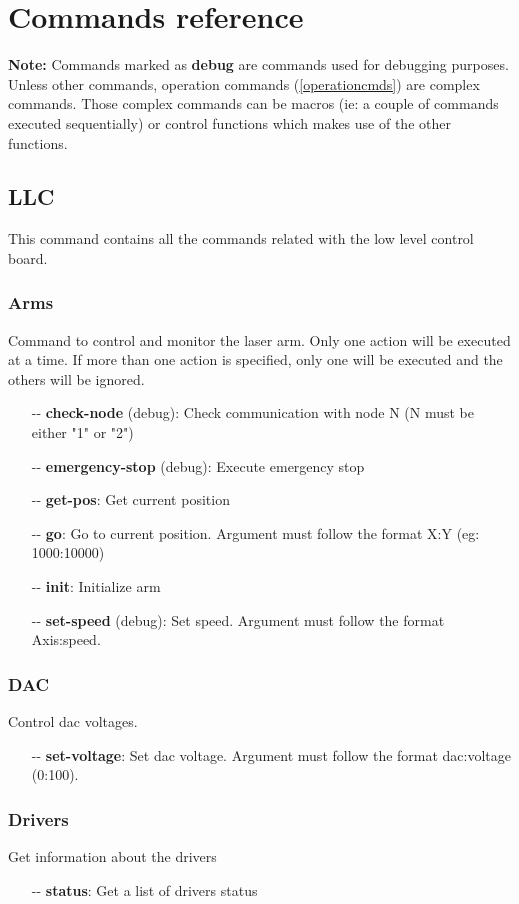 \documentclass[letterpaper, 10 pt]{article}
\begin{document}
\section{Commands reference}
\textbf{Note: }Commands marked as \textbf{debug} are commands used for debugging purposes.\\
\linebreak
Unless other commands, operation commands (\ref{operationcmds}) are complex commands. Those complex commands can be macros (ie: a couple of commands executed sequentially) or control functions which makes use of the other functions. 
\subsection{LLC}
This command contains all the commands related with the low level control board.
\subsubsection{Arms}
Command to control and monitor the laser arm. Only one action will be executed at a time. If more than one action is specified, only one will be executed and the others will be ignored.
\begin{itemize}
	\item[-{}-] \textbf{check-node} (debug): Check communication with node N (N must be either "1" or "2")
	\item[-{}-] \textbf{emergency-stop} (debug): Execute emergency stop
	\item[-{}-] \textbf{get-pos}: Get current position
	\item[-{}-] \textbf{go}: Go to current position. Argument must follow the format X:Y (eg: 1000:10000)
	\item[-{}-] \textbf{init}: Initialize arm
	\item[-{}-] \textbf{set-speed} (debug): Set speed. Argument must follow the format Axis:speed.
\end{itemize}
\subsubsection{DAC}
Control dac voltages.
\begin{itemize}
	\item[-{}-] \textbf{set-voltage}: Set dac voltage. Argument must follow the format dac:voltage (0:100).
\end{itemize}

\subsubsection{Drivers}
Get information about the drivers
\begin{itemize}
	\item[-{}-] \textbf{status}: Get a list of drivers status
\end{itemize}
\end{document}
